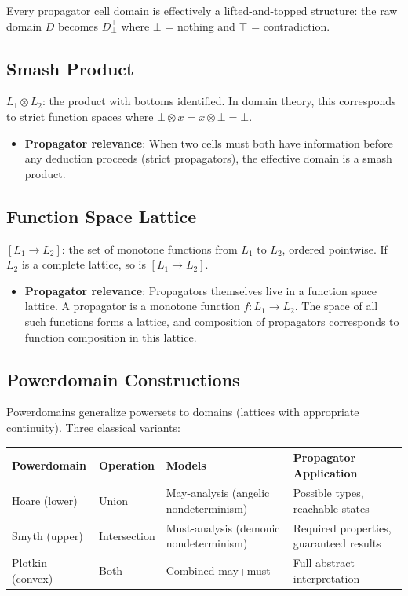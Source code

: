\documentclass[11pt]{article}
\begin{document}
Every propagator cell domain is effectively a lifted-and-topped structure: the raw
domain \(D\) becomes \(D_\bot^\top\) where \(\bot\) = nothing and \(\top\) = contradiction.
\subsection{Smash Product}
\label{sec:orge82448c}

\(L_1 \otimes L_2\): the product with bottoms identified. In domain theory, this
corresponds to strict function spaces where \(\bot \otimes x = x \otimes \bot =
\bot\).

\begin{itemize}
\item \textbf{Propagator relevance}: When two cells must both have information before any
deduction proceeds (strict propagators), the effective domain is a smash product.
\end{itemize}
\subsection{Function Space Lattice}
\label{sec:org405e63f}

\([L_1 \to L_2]\): the set of monotone functions from \(L_1\) to \(L_2\), ordered
pointwise. If \(L_2\) is a complete lattice, so is \([L_1 \to L_2]\).

\begin{itemize}
\item \textbf{Propagator relevance}: Propagators themselves live in a function space lattice.
A propagator is a monotone function \(f : L_1 \to L_2\). The space of all such
functions forms a lattice, and composition of propagators corresponds to
function composition in this lattice.
\end{itemize}
\subsection{Powerdomain Constructions}
\label{sec:org200615f}

Powerdomains generalize powersets to domains (lattices with appropriate
continuity). Three classical variants:

\begin{center}
\begin{tabular}{llll}
Powerdomain & Operation & Models & Propagator Application\\
\hline
Hoare (lower) & Union & May-analysis (angelic nondeterminism) & Possible types, reachable states\\
Smyth (upper) & Intersection & Must-analysis (demonic nondeterminism) & Required properties, guaranteed results\\
Plotkin (convex) & Both & Combined may+must & Full abstract interpretation\\
\end{tabular}
\end{center}
\end{document}
